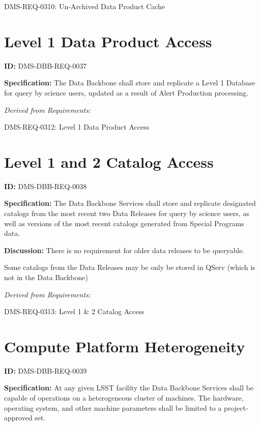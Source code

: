 \documentclass[SE,toc,lsstdraft]{lsstdoc}
\begin{document}
DMS-REQ-0310:
Un-Archived Data Product Cache \newline

\section{Level 1 Data Product Access}

\label{DMS-DBB-REQ-0037}
\textbf{ID:} DMS-DBB-REQ-0037

\textbf{Specification:}
The Data Backbone shall store and replicate a Level 1 Database for query by science users, updated as a result of Alert Production processing.

\emph{Derived from Requirements:}

DMS-REQ-0312:
Level 1 Data Product Access \newline

\section{Level 1 and 2 Catalog Access}

\label{DMS-DBB-REQ-0038}
\textbf{ID:} DMS-DBB-REQ-0038

\textbf{Specification:}
The Data Backbone Services shall store and replicate designated catalogs from the most recent two Data Releases for query by science users, as well as versions of the most recent catalogs generated from Special Programs data.

\textbf{Discussion:}
There is no requirement for older data releases to be queryable.

Some catalogs from the Data Releases may be only be stored in QServ (which is not in the Data Backbone)

\emph{Derived from Requirements:}

DMS-REQ-0313:
Level 1 \& 2 Catalog Access \newline

\section{Compute Platform Heterogeneity}

\label{DMS-DBB-REQ-0039}
\textbf{ID:} DMS-DBB-REQ-0039

\textbf{Specification:}
At any given LSST facility the Data Backbone Services shall be capable of operations on a heterogeneous cluster of machines. The hardware, operating system, and other machine parameters shall be limited to a project-approved set.
\end{document}
